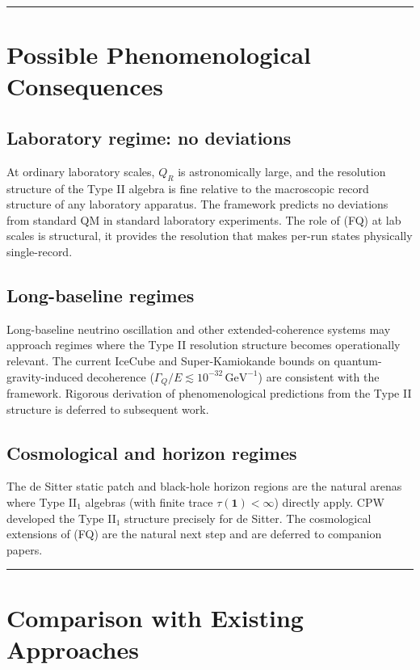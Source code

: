 \documentclass[11pt,a4paper]{article}
\begin{document}
\medskip\hrule\medskip

\section{Possible Phenomenological Consequences}

\subsection{Laboratory regime: no deviations}

At ordinary laboratory scales, $Q_R$ is astronomically large, and the resolution structure of the Type II algebra is fine relative to the macroscopic record structure of any laboratory apparatus. The framework predicts no deviations from standard QM in standard laboratory experiments. The role of (FQ) at lab scales is structural, it provides the resolution that makes per-run states physically single-record.

\subsection{Long-baseline regimes}

Long-baseline neutrino oscillation and other extended-coherence systems may approach regimes where the Type II resolution structure becomes operationally relevant. The current IceCube and Super-Kamiokande bounds on quantum-gravity-induced decoherence ($\Gamma_Q/E \lesssim 10^{-32}\,\mathrm{GeV}^{-1}$) are consistent with the framework. Rigorous derivation of phenomenological predictions from the Type II structure is deferred to subsequent work.

\subsection{Cosmological and horizon regimes}

The de Sitter static patch and black-hole horizon regions are the natural arenas where Type II$_1$ algebras (with finite trace $\tau(\mathbf{1}) < \infty$) directly apply. CPW developed the Type II$_1$ structure precisely for de Sitter. The cosmological extensions of (FQ) are the natural next step and are deferred to companion papers.

\medskip\hrule\medskip

\section{Comparison with Existing Approaches}
\end{document}
